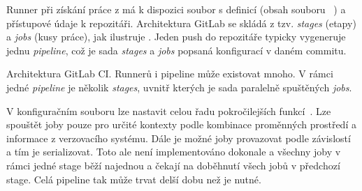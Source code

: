         Runner při získání práce z  má k dispozici soubor s definicí (obsah souboru ~\cite{gitlab-runner-yaml}) a přístupové údaje k repozitáři. Architektura GitLab \CI se skládá z tzv. \textit{stages} (etapy) a \textit{jobs} (kusy práce), jak ilustruje . Jeden push do repozitáře typicky vygeneruje jednu \textit{pipeline}, což je sada \textit{stages} a \textit{jobs} popsaná konfigurací \CI v daném commitu.

        \begin{iffigure}
            \centering
            \caption{Architektura GitLab CI. Runnerů i pipeline může existovat mnoho. V rámci jedné \textit{pipeline} je několik \textit{stages}, uvnitř kterých je sada paralelně spuštěných \textit{jobs}.}
            \label{pic:gitlab-ci-architecture}
        \end{iffigure}

        V konfiguračním souboru lze nastavit celou řadu pokročilejších funkcí~\cite{gitlab-runner-yaml}. Lze spouštět joby pouze pro určité kontexty podle kombinace proměnných prostředí a informace z verzovacího systému. Dále je možné joby provazovat podle závislostí a tím je serializovat. Toto ale není implementováno dokonale a všechny joby v rámci jedné stage běží najednou a čekají na doběhnutí všech jobů v předchozí stage. Celá pipeline tak může trvat delší dobu než je nutné.

